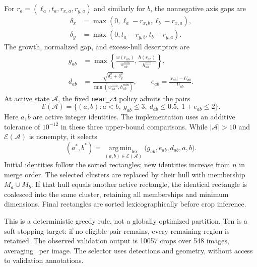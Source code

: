 \documentclass[journal]{IEEEtran}
\begin{document}
For $r_a=(\ell_a,t_a,r_{x,a},r_{y,a})$ and similarly for $b$, the nonnegative axis gaps are
\begin{equation}
\begin{aligned}
\delta_x&=\max(0,\ell_a-r_{x,b},\ell_b-r_{x,a}),\\
\delta_y&=\max(0,t_a-r_{y,b},t_b-r_{y,a}).
\end{aligned}
\label{eq:axis-gap}
\end{equation}
The growth, normalized gap, and excess-hull descriptors are
\begin{equation}
\begin{aligned}
g_{ab}&=\max\left\{\frac{w(r_{ab})}{w_{ab}^{\min}},
                         \frac{h(r_{ab})}{h_{ab}^{\min}}\right\},\\
d_{ab}&=\frac{\sqrt{\delta_x^2+\delta_y^2}}
                   {\min(w_{ab}^{\min},h_{ab}^{\min})},\qquad
e_{ab}=\frac{|r_{ab}|-U_{ab}}{U_{ab}}.
\end{aligned}
\label{eq:growth}
\end{equation}
At active state $\mathcal A$, the fixed \texttt{near\_z3} policy admits the pairs
\begin{equation}
\mathcal E(\mathcal A)=
\{(a,b):a<b,\ g_{ab}\leq3,\ d_{ab}\leq0.5,\ 1+e_{ab}\leq2\}.
\label{eq:eligible}
\end{equation}
Here $a,b$ are active integer identities. The implementation uses an additive tolerance of $10^{-12}$ in these three upper-bound comparisons. While $|\mathcal A|>10$ and $\mathcal E(\mathcal A)$ is nonempty, it selects
\begin{equation}
(a^*,b^*)=\underset{(a,b)\in\mathcal E(\mathcal A)}
{\operatorname{arg\,min}_{\mathrm{lex}}}
\bigl(g_{ab},e_{ab},d_{ab},a,b\bigr).
\label{eq:merge-choice}
\end{equation}
Initial identities follow the sorted rectangles; new identities increase from $n$ in merge order. The selected clusters are replaced by their hull with membership $M_a\cup M_b$. If that hull equals another active rectangle, the identical rectangle is coalesced into the same cluster, retaining all memberships and minimum dimensions. Final rectangles are sorted lexicographically before crop inference.

This is a deterministic greedy rule, not a globally optimized partition. Ten is a soft stopping target: if no eligible pair remains, every remaining region is retained. The observed validation output is 10057 crops over 548 images, averaging \MeanCrops\ per image. The selector uses detections and geometry, without access to validation annotations.
\end{document}
